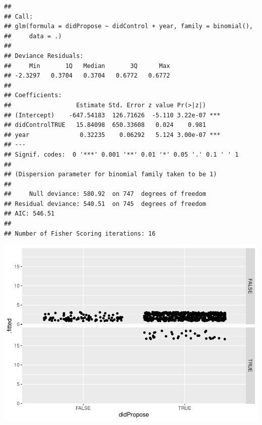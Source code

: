 \documentclass[
]{article}
\newenvironment{Shaded}{\begin{snugshade}}{\end{snugshade}}
\newcommand{\DataTypeTok}[1]{\textcolor[rgb]{0.13,0.29,0.53}{#1}}
\newcommand{\KeywordTok}[1]{\textcolor[rgb]{0.13,0.29,0.53}{\textbf{#1}}}
\newcommand{\NormalTok}[1]{#1}
\newcommand{\OperatorTok}[1]{\textcolor[rgb]{0.81,0.36,0.00}{\textbf{#1}}}
\newcommand{\StringTok}[1]{\textcolor[rgb]{0.31,0.60,0.02}{#1}}
\begin{document}
\begin{Shaded}
\end{Shaded}

\begin{verbatim}
## 
## Call:
## glm(formula = didPropose ~ didControl + year, family = binomial(), 
##     data = .)
## 
## Deviance Residuals: 
##     Min       1Q   Median       3Q      Max  
## -2.3297   0.3704   0.3704   0.6772   0.6772  
## 
## Coefficients:
##                  Estimate Std. Error z value Pr(>|z|)    
## (Intercept)    -647.54183  126.71626  -5.110 3.22e-07 ***
## didControlTRUE   15.84098  650.33608   0.024    0.981    
## year              0.32235    0.06292   5.124 3.00e-07 ***
## ---
## Signif. codes:  0 '***' 0.001 '**' 0.01 '*' 0.05 '.' 0.1 ' ' 1
## 
## (Dispersion parameter for binomial family taken to be 1)
## 
##     Null deviance: 580.92  on 747  degrees of freedom
## Residual deviance: 540.51  on 745  degrees of freedom
## AIC: 546.51
## 
## Number of Fisher Scoring iterations: 16
\end{verbatim}

\begin{Shaded}
\end{Shaded}

\includegraphics{ProposalAnalysis_files/figure-latex/unnamed-chunk-8-2.pdf}
\end{document}
